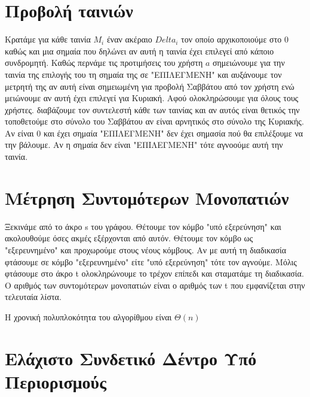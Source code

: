 \documentclass[a4paper,10pt]{article}
\begin{document}
\def\thesubsection {\alph{subsection}}
\renewcommand{\labelenumi}{\alph{enumi}}
\renewcommand{\labelenumii}{(\arabic{enumii})}



\section{Προβολή ταινιών} \setcounter{section}{1}

Κρατάμε για κάθε ταινία $M_i$ έναν ακέραιο $Delta_i$ τον οποίο αρχικοποιούμε
στο 0 καθώς και μια σημαία που δηλώνει αν αυτή η ταινία έχει επιλεγεί από
κάποιο συνδρομητή. Καθώς περνάμε τις προτιμήσεις του χρήστη $a$ σημειώνουμε
για την ταινία της επιλογής του τη σημαία της σε "ΕΠΙΛΕΓΜΕΝΗ" και αυξάνουμε
τον μετρητή της αν αυτή είναι σημειωμένη για προβολή Σαββάτου από τον χρήστη
ενώ μειώνουμε αν αυτή έχει επιλεγεί για Κυριακή. Αφού ολοκληρώσουμε για όλους
τους χρήστες. διαβάζουμε τον συντελεστή κάθε των ταινίας και αν αυτός είναι
θετικός την τοποθετούμε στο σύνολο του Σαββάτου αν είναι αρνητικός στο σύνολο
της Κυριακής. Αν είναι 0 και έχει σημαία "ΕΠΙΛΕΓΜΕΝΗ" δεν έχει σημασία πού θα
επιλέξουμε να την βάλουμε.  Αν η σημαία δεν είναι "ΕΠΙΛΕΓΜΕΝΗ" τότε αγνοούμε
αυτή την ταινία.

\section{Μέτρηση Συντομότερων Μονοπατιών}
Ξεκινάμε από το άκρο s του γράφου. Θέτουμε τον κόμβο "υπό εξερεύνηση" και
ακολουθούμε όσες ακμές εξέρχονται από αυτόν. Θέτουμε τον κόμβο ως
"εξερευνημένο" και προχωρούμε στους νέους κόμβους. Αν με αυτή τη διαδικασία
φτάσουμε σε κόμβο "εξερευνημένο" είτε "υπό εξερεύνηση" τότε τον αγνούμε. Μόλις
φτάσουμε στο άκρο t ολοκληρώνουμε το τρέχον επίπεδι και σταματάμε τη
διαδικασία. Ο αριθμός των συντομότερων μονοπατιών είναι ο αριθμός των t που
εμφανίζεται στην τελευταία λίστα.

Η χρονική πολυπλοκότητα του αλγορίθμου είναι $\Theta(n)$

\section{Ελάχιστο Συνδετικό Δέντρο Υπό Περιορισμούς}
\end{document}
